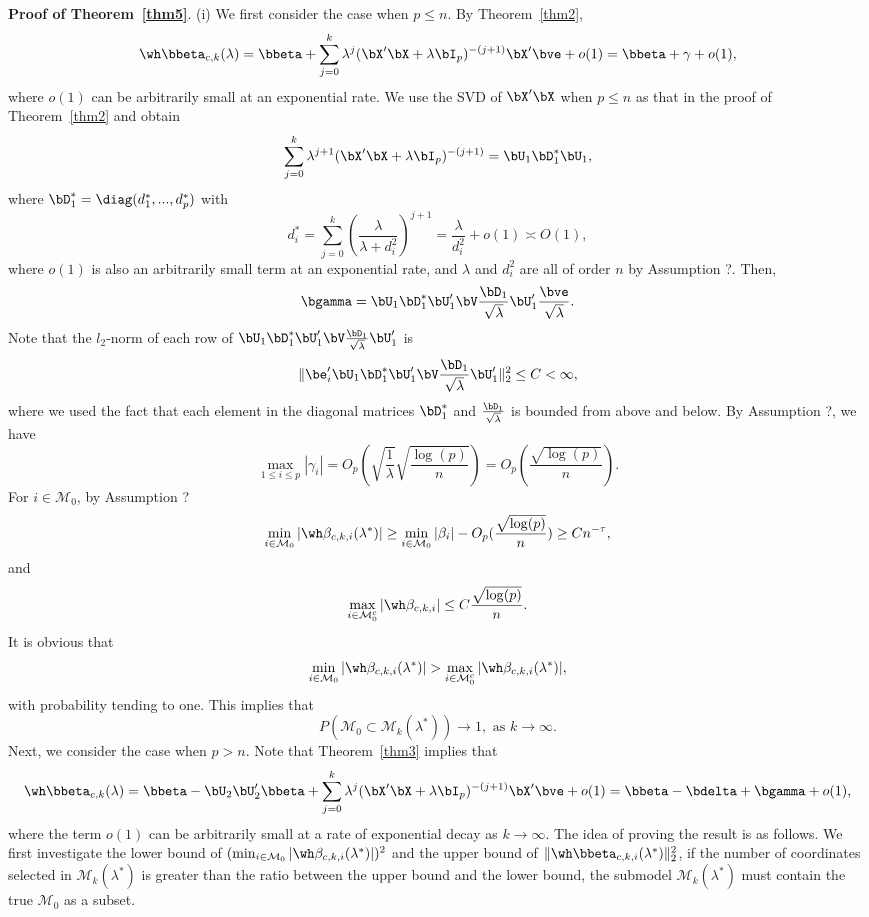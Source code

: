{{{\bf Proof of Theorem~\ref{thm5}}. (i) We first consider the case when $p\leq n$. By Theorem~\ref{thm2},
\[\wh\bbeta_{c,k}(\lambda)=\bbeta+\sum_{j=0}^k\lambda^j(\bX'\bX+\lambda\bI_p)^{-(j+1)}\bX'\bve+o(1)=\bbeta+\gamma+o(1),\]
where $o(1)$ can be arbitrarily small at an exponential rate. We use the SVD of $\bX'\bX$ when $p\leq n$ as that in the proof of Theorem~\ref{thm2} and obtain
\[\sum_{j=0}^k\lambda^{j+1}(\bX'\bX+\lambda\bI_p)^{-(j+1)}=\bU_1\bD_1^*\bU_1,\]
where $\bD_1^*=\diag(d_1^*,...,d_p^*)$ with
\[d_i^*=\sum_{j=0}^k\left(\frac{\lambda}{\lambda+d_i^2}\right)^{j+1}=\frac{\lambda}{d_i^2}+o(1)\asymp O(1),\]
where $o(1)$ is also an arbitrarily small term at an exponential rate, and $\lambda$ and $d_i^2$ are all of order $n$ by Assumption ?. Then, 
\[\bgamma=\bU_1\bD_1^*\bU_1'\bV\frac{\bD_1}{\sqrt{\lambda}}\bU_1'\frac{\bve}{\sqrt{\lambda}}.\]
Note that the $l_2$-norm of each row of $\bU_1\bD_1^*\bU_1'\bV\frac{\bD_1}{\sqrt{\lambda}}\bU_1'$ is
\[\|\be_i'\bU_1\bD_1^*\bU_1'\bV\frac{\bD_1}{\sqrt{\lambda}}\bU_1'\|_2^2\leq C<\infty,\]
where we used the fact that each element in the diagonal matrices $\bD_1^*$ and $\frac{\bD_1}{\sqrt{\lambda}}$ is bounded from above and below. By Assumption ?, we have
\[\max_{1\leq i\leq p}|\gamma_i|=O_p(\sqrt{\frac{1}{\lambda}}\sqrt{\frac{\log(p)}{n}})=O_p(\frac{\sqrt{\log(p)}}{n}).\]
For $i\in\mathcal{M}_0$, by Assumption ?
\[\min_{i\in\mathcal{M}_0}|\wh\beta_{c,k,i}(\lambda^*)|\geq \min_{i\in\mathcal{M}_0}|\beta_i|-O_p(\frac{\sqrt{\log(p)}}{n})\geq C n^{-\tau},\]
and
\[\max_{i\in\mathcal{M}_0^c}|\wh\beta_{c,k,i}|\leq C\frac{\sqrt{\log(p)}}{n}.\]
It is obvious that 
\[\min_{i\in\mathcal{M}_0}|\wh\beta_{c,k,i}(\lambda^*)|>\max_{i\in\mathcal{M}_0^c}|\wh\beta_{c,k,i}(\lambda^*)|,\]
with probability tending to one. This implies that
\[P(\mathcal{M}_0\subset\mathcal{M}_k(\lambda^*))\rightarrow 1,\,\, \text{as}\,\, k\rightarrow\infty.\]
Next, we consider the case when $p>n$. Note that Theorem~\ref{thm3} implies that
\begin{equation}\label{betk:rp}
    \wh\bbeta_{c,k}(\lambda)=\bbeta-\bU_2\bU_2'\bbeta+\sum_{j=0}^k\lambda^j(\bX'\bX+\lambda\bI_p)^{-(j+1)}\bX'\bve+o(1)=\bbeta-\bdelta+\bgamma+o(1),
\end{equation}
where the term $o(1)$ can be arbitrarily small at a rate of exponential decay as $k\rightarrow\infty$.
The idea of proving the result is as follows. We first investigate the lower bound of $(\min_{i\in\mathcal{M}_0}|\wh\beta_{c,k,i}(\lambda^*)|)^2$ and the upper bound of $\|\wh\bbeta_{c,k,i}(\lambda^*)\|_2^2$, if the number of coordinates selected in $\mathcal{M}_k(\lambda^*)$ is greater than 
the ratio between the upper bound and the lower bound, the submodel $\mathcal{M}_k(\lambda^*)$ must contain the true $\mathcal{M}_0$ as a subset.

}}

